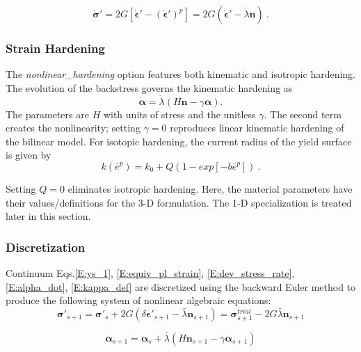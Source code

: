\documentclass[11pt]{report}
\numberwithin{equation}{section}
\newcommand{\bmf } {\boldsymbol }
\begin{document}
\begin{equation}\label{E:dev_stress_rate}
\dot{\bmf{\sigma}}'=2G \left[ \dot{\bmf{\epsilon}}' - 
\left(\dot{\bmf{\epsilon}}' \right) ^p \right] =
2G \left( \dot{\bmf{\epsilon}}' - \dot{\lambda}\bmf{n} \right)~.
\end{equation}
%

\subsubsection {Strain Hardening}

\noindent The \textit{nonlinear\_hardening} option features both 
kinematic and isotropic hardening.
The evolution of the backstress governs the kinematic hardening as
%
\begin{equation}\label{E:alpha_dot}
\dot{\bmf{\alpha}}=
\dot{\lambda}\left({H}\bmf{n}-\gamma\bmf{\alpha}\right).
\end{equation}
%
The parameters are $H$ with units of stress and the unitless $\gamma$. The
second term creates the nonlinearity; setting $\gamma=0$ reproduces linear kinematic 
hardening of the bilinear model. For isotopic hardening, the current radius of the yield
surface is given by
%
\begin{equation}\label{E:kappa_def}
k\left(\bar e^p \right)= k_0 + 
Q \left( 1-exp \left [{-b \bar e^p}\right] \right) ~.
\end{equation}

\noindent Setting $Q=0$ eliminates isotropic hardening. Here, the material
parameters have their values/definitions for the 3-D formulation. The 1-D specialization
is treated later in this section.

\subsubsection {Discretization}
Continuum Eqs.\;\eqref{E:ys_1}, \eqref{E:equiv_pl_strain}, \eqref{E:dev_stress_rate},
\eqref{E:alpha_dot}, \eqref{E:kappa_def} are discretized using the backward
Euler method to produce the following system of nonlinear algebraic equations:
%
\begin{equation}
{\bmf{\sigma }}{'_{s + 1}} = 
{\bmf{\sigma }}{'_s} + 2G\left( {\delta \bmf{\epsilon}'_{s + 1} - 
\bar \lambda {{\bmf{n}}_{s + 1}}} \right) =
 {\bmf{\sigma }}_{s + 1}^{trial} - 2G\bar \lambda {{\bmf{n}}_{s + 1}}
\end{equation}

\begin{equation}
{{\bmf{\alpha }}_{s + 1}} = 
{{\bmf{\alpha }}_s} + \bar \lambda \left( {H{{\bmf{n}}_{s + 1}} - 
\gamma {{\bmf{\alpha }}_{s + 1}}} \right)
\end{equation}
\end{document}

